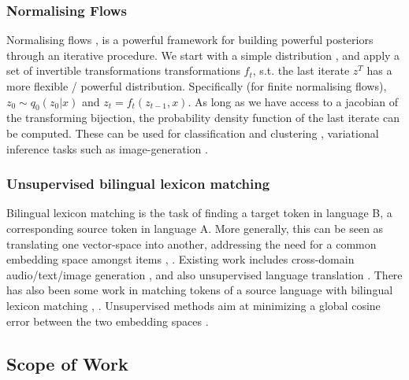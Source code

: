 \documentclass{NSF}
\begin{document}
\subsubsection{Normalising Flows}

Normalising flows \cite{variational_inference_using_normalized_flows}, \cite{normalising_flows} is a powerful framework for building powerful posteriors through an iterative procedure.
We start with a simple distribution , and apply a set of invertible transformations transformations $f_t$, s.t. the last iterate $z^T$ has a more flexible / powerful distribution.
Specifically (for finite normalising flows), $z_0 \sim q_0(z_0|x)$ and $z_t = f_t(z_{t-1}, x)$.
As long as we have access to a jacobian of the transforming bijection, the probability density function of the last iterate can be computed.
These can be used for classification and clustering \cite{normalising_flows},  variational inference tasks \cite{iaf} such as image-generation \cite{nvp}.

\subsubsection{Unsupervised bilingual lexicon matching}

Bilingual lexicon matching is the task of finding a target token in language B, a corresponding source token in language A.
More generally, this can be seen as translating one vector-space into another, addressing the need for a common embedding space amongst items \cite{wordvec}, \cite{nmtrepresentation}.
Existing work includes cross-domain audio/text/image generation \cite{microsoft_3way} \cite{syd_gan} \cite{conditional_image_to_image} \cite{bair_gan}, and also unsupervised language translation \cite{unsupervised_phrasebased_translation}.
There has also been some work in matching tokens of a source language with bilingual lexicon matching \cite{art_1} \cite{art_2}, \cite{springer}.
Unsupervised methods aim at minimizing a global cosine error between the two embedding spaces \cite{muse}.

\subsection{Scope of Work}
\end{document}
